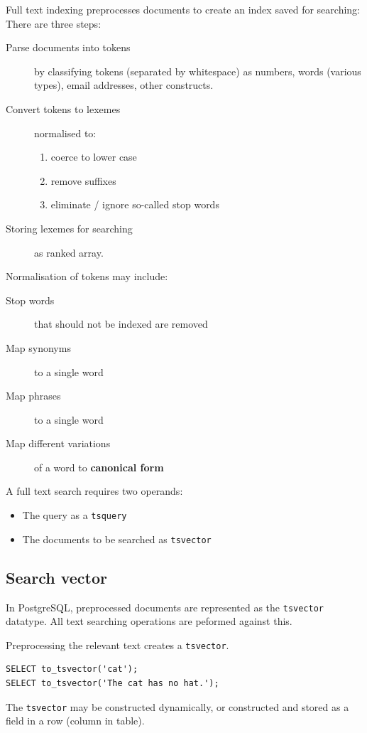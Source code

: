 \documentclass{pgnotes}
\begin{document}
Full text indexing preprocesses documents to create an index saved for searching:
There are three steps:
\begin{description}
\item[Parse documents into tokens] by classifying tokens (separated by whitespace) as numbers, words (various types), email addresses, other constructs.
\item[Convert tokens to lexemes] normalised to:
  \begin{enumerate}
  \item coerce to lower case
  \item remove suffixes
  \item eliminate / ignore so-called stop words
  \end{enumerate}
\item[Storing lexemes for searching] as ranked array.
\end{description}
Normalisation of tokens may include:
\begin{description}
\item[Stop words] that should not be indexed are removed
\item[Map synonyms] to a single word
\item[Map phrases] to a single word
\item[Map different variations] of a word to \textbf{canonical form}
\end{description}


A full text search requires two operands:
\begin{itemize}
\item The query as a \texttt{tsquery}
\item The documents to be searched as \texttt{tsvector}
\end{itemize}


\subsection{Search vector}

In PostgreSQL, preprocessed documents are represented as the \texttt{tsvector} datatype.
All text searching operations are peformed against this. 

Preprocessing the relevant text creates a \texttt{tsvector}.
\begin{verbatim}
SELECT to_tsvector('cat');
SELECT to_tsvector('The cat has no hat.');
\end{verbatim}
The \texttt{tsvector} may be constructed dynamically, or constructed and stored as a field in a row (column in table).
\end{document}
